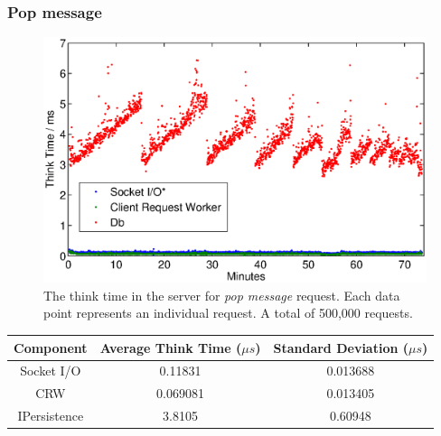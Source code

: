 \documentclass{article}
\begin{document}
            \subsubsection{Pop message}
                \begin{figure}[H]
                    \includegraphics[scale=0.50]{thinktime_500k_pop}
                    \caption{The think time in the server for \textit{pop message} request. Each data point represents an individual request. A total of 500,000 requests.}
                    \label{fig:thinktime_500k_pop}
                \end{figure}

                \begin{table}[H]
                    \begin{tabular}{|c|c|c|}
                        \hline 
                        \textbf{Component} & \textbf{Average Think Time} ($\mu s$)  & \textbf{Standard Deviation ($\mu s$)} \\ 
                        \hline 
                        Socket I/O &0.11831 &0.013688\\
                        \hline 
                        CRW &0.069081 &0.013405\\
                        \hline 
                        IPersistence &3.8105 &0.60948\\
                        \hline 
                    \end{tabular}
                \end{table}
                
\end{document}
